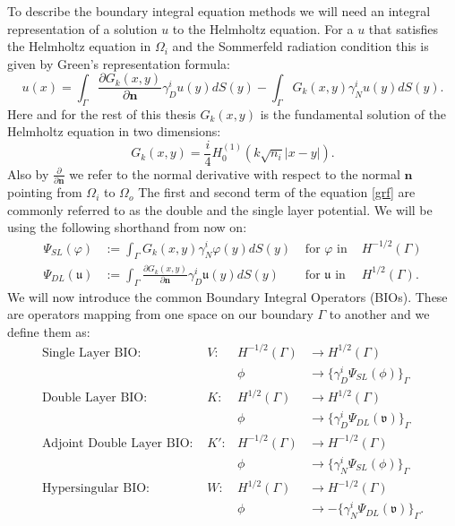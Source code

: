 \documentclass[a4paper, oneside]{thirdparty_stylesheets/discothesis}
\begin{document}
To describe the boundary integral equation methods we will need an integral representation of a solution $u$ to the Helmholtz equation.
For a $u$ that satisfies the Helmholtz equation in $\Omega_i$ and the Sommerfeld radiation condition this is given by Green's representation formula:
\begin{equation}
	u(x) = \int_\Gamma \frac{\partial G_k(x,y)}{\partial \mathbf{n}}\gamma^i_Du(y)dS(y) - \int_\Gamma G_k(x,y)\gamma^i_Nu(y)dS(y). \label{grf}
\end{equation}
Here and for the rest of this thesis $G_k(x,y)$ is the fundamental solution of the Helmholtz equation in two dimensions:
\begin{equation}
	G_k(x,y) = \frac{i}{4}H_0^{(1)}(k\sqrt{n_i}|x-y|). \label{fs}
\end{equation}
Also by $\frac{\partial }{\partial \mathbf{n}}$ we refer to the normal derivative with respect to the normal $\mathbf{n}$ pointing from $\Omega_i$ to $\Omega_o$
The first and second term of the equation \ref{grf} are commonly referred to as the double and the single layer potential. 
We will be using the following shorthand from now on:
\begin{align}
	\Psi_{SL}(\varphi) &:= \int_\Gamma G_k(x,y)\gamma^i_N \varphi(y)dS(y) &\text{ for } \varphi \text{ in } & H^{-1/2}(\Gamma) \\
	\Psi_{DL}(\mathfrak{u}) &:= \int_\Gamma \frac{\partial G_k(x,y)}{\partial \mathbf{n}}\gamma^i_D \mathfrak{u}(y)dS(y) &\text{ for } \mathfrak{u}\text{ in } & H^{1/2}(\Gamma) .
\end{align}
We will now introduce the common Boundary Integral Operators (BIOs). 
These are operators mapping from one space on our boundary $\Gamma$ to another and we define them as:
\begin{align}
	\text{Single Layer BIO: }& V: &H^{-1/2}(\Gamma)& \longrightarrow H^{1/2}(\Gamma)\\
							 &	& \phi & \longrightarrow \{\gamma^i_D \Psi_{SL}(\phi)\}_{\Gamma} \nonumber \\
	\text{Double Layer BIO: }& K: &H^{1/2}(\Gamma)& \longrightarrow H^{1/2}(\Gamma)\\
							 &	& \phi &  \longrightarrow \{\gamma^i_D \Psi_{DL}(\mathfrak{v})\}_{\Gamma} \nonumber\\
	\text{Adjoint Double Layer BIO: }& K': &H^{-1/2}(\Gamma)& \longrightarrow H^{-1/2}(\Gamma)\\
									 &	& \phi &  \longrightarrow  \{\gamma^i_N \Psi_{SL}(\phi)\}_{\Gamma} \nonumber\\
	\text{Hypersingular BIO: }& W: &H^{1/2}(\Gamma)& \longrightarrow H^{-1/2}(\Gamma)\\
							  &	& \phi &  \longrightarrow  -\{\gamma^i_N \Psi_{DL}(\mathfrak{v})\}_{\Gamma}.\nonumber
\end{align}
\end{document}
